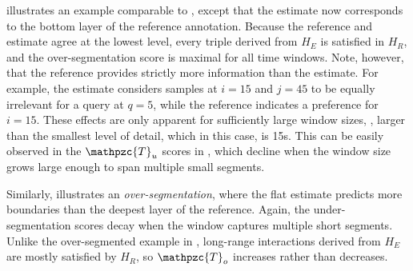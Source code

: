 \documentclass{article}
\def\shag{\ensuremath{\mathpzc{T}}}
\begin{document}
 illustrates an example comparable to , except that the
estimate now corresponds to the bottom layer of the reference annotation.
Because the reference and estimate agree at the lowest level, every triple derived from $H_E$ is satisfied in $H_R$, and the over-segmentation score is maximal for all time windows.
Note, however, that the reference provides strictly more information than the estimate.  For example, the estimate considers samples at $i=15$ and $j=45$ to be equally irrelevant for a 
query at $q=5$, while the reference indicates a preference for $i=15$.
These effects are only apparent for sufficiently large window sizes, \eg, larger than the smallest level of
detail, which in this case, is 15s.  This can be easily observed in the $\shag_u$
scores in , which decline when the window size grows
large enough to span multiple small segments.

Similarly,  illustrates an \emph{over-segmentation}, where the flat estimate
predicts more boundaries than the deepest layer of the reference.  Again, the under-segmentation scores decay when the window captures multiple short segments.
Unlike the over-segmented example in , long-range interactions derived from $H_E$ are mostly satisfied by $H_R$, so $\shag_o$ increases
rather than decreases.
\end{document}
